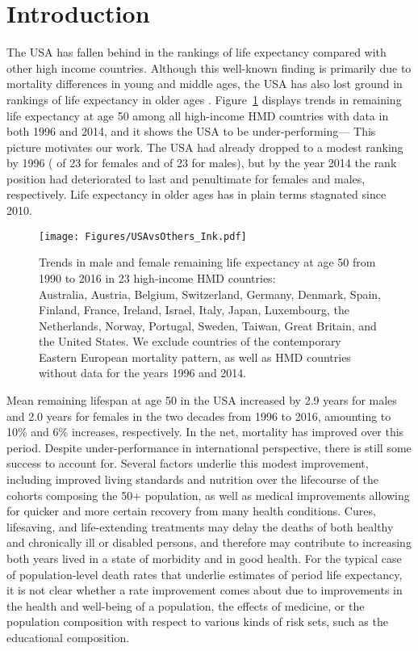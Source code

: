 \section{Introduction}
The USA has fallen behind in the rankings of life expectancy compared with other high income countries. Although this well-known finding is primarily due to mortality differences in young and middle ages, the USA has also lost ground in rankings of life expectancy in older ages \citep{HMD}. Figure~\ref{fig:uslose} displays trends in remaining life expectancy at age 50 among all high-income HMD countries with data in both 1996 and 2014, and it shows the USA to be under-performing--- This picture motivates our work. The USA had already dropped to a modest ranking by 1996 ( of 23 for females and  of 23 for males), but by the year 2014 the rank position had deteriorated to last and penultimate for females and males, respectively. Life expectancy in older ages has in plain terms stagnated since 2010. 

\begin{figure}[ht!]
\centering
\texttt{[image: Figures/USAvsOthers\_Ink.pdf]}
\caption{Trends in male and female remaining life expectancy at age 50 from 1990 to 2016 in 23 high-income HMD countries:  \\ \footnotesize Australia, Austria, Belgium, Switzerland, Germany, Denmark, Spain, Finland, France, Ireland, Israel, Italy, Japan, Luxembourg, the Netherlands, Norway, Portugal, Sweden, Taiwan, Great Britain, and the United States. We exclude countries of the contemporary Eastern European mortality pattern, as well as HMD countries without data for the years 1996 and 2014.}
\label{fig:uslose}
\end{figure}

Mean remaining lifespan at age 50 in the USA increased by 2.9 years for males and 2.0 years for females in the two decades from 1996 to 2016, amounting to 10\% and 6\% increases, respectively. In the net, mortality has improved over this period. Despite under-performance in international perspective, there is still some success to account for. Several factors underlie this modest improvement, including improved living standards and nutrition over the lifecourse of the cohorts composing the 50+ population, as well as medical improvements allowing for quicker and more certain recovery from many health conditions. Cures, lifesaving, and life-extending treatments may delay the deaths of both healthy and chronically ill or disabled persons, and therefore may contribute to increasing both years lived in a state of morbidity and in good health. For the typical case of population-level death rates that underlie estimates of period life expectancy, it is not clear whether a rate improvement comes about due to improvements in the health and well-being of a population, the effects of medicine, or the population composition with respect to various kinds of risk sets, such as the educational composition. 

